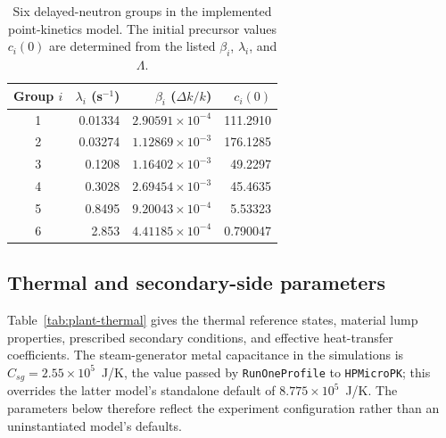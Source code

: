 \begin{table}[htbp]
\centering\small
\setlength{\tabcolsep}{6pt}
\caption{Six delayed-neutron groups in the implemented point-kinetics model. The initial precursor values $c_i(0)$ are determined from the listed $\beta_i$, $\lambda_i$, and $\Lambda$.}
\label{tab:plant-delayed}
\begin{tabular}{@{}crrr@{}}
\toprule
Group $i$ & $\lambda_i$ (s$^{-1}$) & $\beta_i$ ($\Delta k/k$) & $c_i(0)$\\
\midrule
1 & 0.01334 & $2.90591\times10^{-4}$ & 111.2910\\
2 & 0.03274 & $1.12869\times10^{-3}$ & 176.1285\\
3 & 0.1208 & $1.16402\times10^{-3}$ & 49.2297\\
4 & 0.3028 & $2.69454\times10^{-3}$ & 45.4635\\
5 & 0.8495 & $9.20043\times10^{-4}$ & 5.53323\\
6 & 2.853 & $4.41185\times10^{-4}$ & 0.790047\\
\bottomrule
\end{tabular}
\end{table}

\subsection{Thermal and secondary-side parameters}

Table~\ref{tab:plant-thermal} gives the thermal reference states, material lump properties, prescribed secondary conditions, and effective heat-transfer coefficients. The steam-generator metal capacitance in the simulations is $C_{sg}=2.55\times10^5$~J/K, the value passed by \texttt{RunOneProfile} to \texttt{HPMicroPK}; this overrides the latter model's standalone default of $8.775\times10^5$~J/K. The parameters below therefore reflect the experiment configuration rather than an uninstantiated model's defaults.

